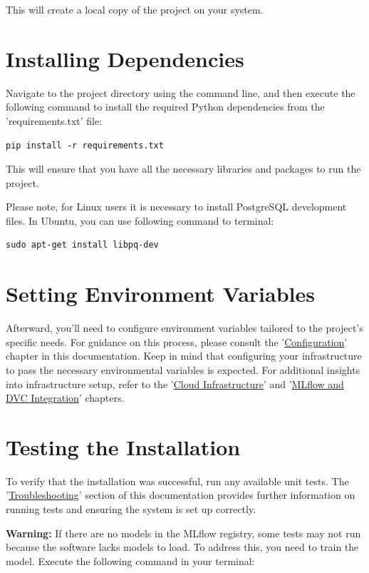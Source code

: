 \documentclass{report}
\begin{document}
This will create a local copy of the project on your system.

\section{Installing Dependencies}

Navigate to the project directory using the command line, and then execute the following command to install the required Python dependencies from the 'requirements.txt' file:

\begin{verbatim}
pip install -r requirements.txt
\end{verbatim}

This will ensure that you have all the necessary libraries and packages to run the project.

Please note, for Linux users it is necessary to install PostgreSQL development files. In Ubuntu, you can use following command to terminal:
\begin{verbatim}
sudo apt-get install libpq-dev
\end{verbatim}

\section{Setting Environment Variables}

Afterward, you'll need to configure environment variables tailored to the project's specific needs. For guidance on this process, please consult the '\hyperref[chap:configuration]{Configuration}' chapter in this documentation. Keep in mind that configuring your infrastructure to pass the necessary environmental variables is expected. For additional insights into infrastructure setup, refer to the '\hyperref[chap:cloud-infrastructure]{Cloud Infrastructure}' and '\hyperref[chap:mlflow-dvc-integration]{MLflow and DVC Integration}' chapters.

\section{Testing the Installation}

To verify that the installation was successful, run any available unit tests. The '\hyperref[chap:troubleshooting]{Troubleshooting}' section of this documentation provides further information on running tests and ensuring the system is set up correctly.

\textbf{Warning:} If there are no models in the MLflow registry, some tests may not run because the software lacks models to load. To address this, you need to train the model. Execute the following command in your terminal:
\end{document}
